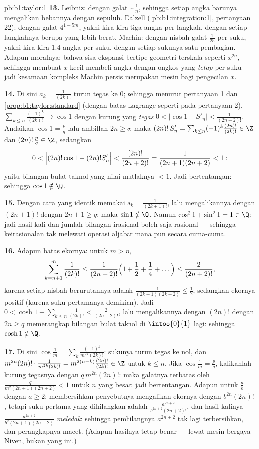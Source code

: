 \begin{solution}{pb:b1:taylor:1}
\textbf{13.} Leibniz: dengan galat $\sim \frac1n$, sehingga setiap angka barunya
mengalikan bebannya dengan sepuluh. Dalzell
(\cref{pb:b1:integration:1}, pertanyaan 22): dengan galat $4^{1-5m}$,
yakni kira-kira tiga angka per langkah, dengan setiap langkahnya berupa  yang lebih berat.
Machin: dengan nisbah galat $\frac{1}{25}$ per suku, yakni kira-kira $1.4$ angka
per suku, dengan setiap sukunya satu pembagian. Adapun moralnya: bahwa sisa
ekspansi bertipe geometri terskala seperti $x^{2n}$, sehingga membuat $x$
kecil membeli angka dengan ongkos yang \emph{tetap} per suku --- jadi kesamaan
kompleks Machin persis merupakan mesin bagi pengecilan $x$.

\textbf{14.} Di sini $a_k = \frac{1}{(2k)!}$ turun tegas ke $0$;
sehingga menurut pertanyaan 1 dan \cref{prop:b1:taylor:standard} (dengan batas
Lagrange seperti pada pertanyaan 2), $\sum_{k \leq n}\frac{(-1)^k}{(2k)!}
\to \cos 1$ dengan kurung yang \emph{tegas} $0 < \bigl|\cos 1 -
S'_n\bigr| < \frac{1}{(2n+2)!}$. Andaikan $\cos 1 = \frac pq$ lalu
ambillah $2n \geq q$: maka $(2n)!\,S'_n = \sum_{k\leq n} (-1)^k
\frac{(2n)!}{(2k)!} \in \Z$ dan $(2n)!\,\frac pq \in \Z$, sedangkan
\[
0 < \Bigl|(2n)!\cos 1 - (2n)!S'_n\Bigr| <
\frac{(2n)!}{(2n+2)!} = \frac{1}{(2n+1)(2n+2)} < 1 :
\]
yaitu bilangan bulat taknol yang nilai mutlaknya $< 1$. Jadi bertentangan: sehingga $\cos
1 \notin \Q$.

\textbf{15.} Dengan cara yang identik memakai $a_k = \frac{1}{(2k+1)!}$,
lalu mengalikannya dengan $(2n+1)!$ dengan $2n + 1 \geq q$: maka $\sin 1 \notin
\Q$. Namun $\cos^2 1 + \sin^2 1 = 1 \in \Q$: jadi hasil kali dan jumlah
bilangan irasional boleh saja rasional --- sehingga keirasionalan tak melewati
operasi aljabar mana pun secara cuma-cuma.

\textbf{16.} Adapun batas ekornya: untuk $m > n$,
\[
\sum_{k=n+1}^{m} \frac{1}{(2k)!}
\leq \frac{1}{(2n+2)!}\Bigl(1 + \frac12 + \frac14 +
\dots\Bigr) \leq \frac{2}{(2n+2)!} ,
\]
karena setiap nisbah berurutannya adalah $\frac{1}{(2k+1)(2k+2)} \leq
\frac12$; sedangkan ekornya positif (karena suku pertamanya demikian). Jadi $0 <
\cosh 1 - \sum_{k\leq n}\frac{1}{(2k)!} < \frac{2}{(2n+2)!}$,
lalu mengalikannya dengan $(2n)!$ dengan $2n \geq q$ memerangkap bilangan bulat
taknol di $\intoo{0}{1}$ lagi: sehingga $\cosh 1 \notin \Q$.

\textbf{17.} Di sini $\cos\frac1m = \sum_k
\frac{(-1)^k}{m^{2k}(2k)!}$: sukunya turun tegas ke
nol, dan $m^{2n}(2n)!\cdot\frac{1}{m^{2k}(2k)!} =
m^{2(n-k)}\frac{(2n)!}{(2k)!} \in \Z$ untuk $k \leq n$. Jika
$\cos\frac1m = \frac pq$, kalikanlah kurung tegasnya dengan
$q\,m^{2n}(2n)!$: maka galatnya terbatas oleh
$\frac{q}{m^2(2n+1)(2n+2)} < 1$ untuk $n$ yang besar: jadi bertentangan.
Adapun untuk $\frac ab$ dengan $a \geq 2$: membersihkan penyebutnya mengalikan
ekornya dengan $b^{2n}(2n)!$, tetapi suku pertama yang dihilangkan adalah
$\frac{a^{2n+2}}{b^{2n+2}(2n+2)!}$, dan hasil kalinya
$\frac{a^{2n+2}}{b^2(2n+1)(2n+2)}$ \emph{meledak}: sehingga
pembilangnya $a^{2n+2}$ tak lagi terbersihkan, dan perangkapnya macet.
(Adapun hasilnya tetap benar --- lewat mesin bergaya Niven, bukan
yang ini.)


\end{solution}
